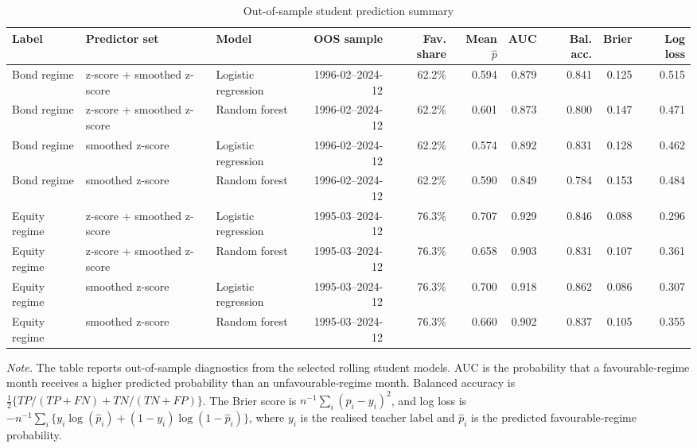 \begin{table}[H]
\centering
\caption{Out-of-sample student prediction summary}
\label{tab:student-oos-prediction-summary}
\scriptsize
\setlength{\tabcolsep}{3.2pt}
\renewcommand{\arraystretch}{1.10}
\begin{adjustbox}{center,max width=\linewidth}
\begin{tabular}{lllrrrrrrr}
\toprule
Label & Predictor set & Model & OOS sample & Fav. share & Mean $\hat p$ & AUC & Bal. acc. & Brier & Log loss \\
\midrule
Bond regime & z-score + smoothed z-score & Logistic regression & 1996-02--2024-12 & 62.2\% & 0.594 & 0.879 & 0.841 & 0.125 & 0.515 \\
Bond regime & z-score + smoothed z-score & Random forest & 1996-02--2024-12 & 62.2\% & 0.601 & 0.873 & 0.800 & 0.147 & 0.471 \\
Bond regime & smoothed z-score & Logistic regression & 1996-02--2024-12 & 62.2\% & 0.574 & 0.892 & 0.831 & 0.128 & 0.462 \\
Bond regime & smoothed z-score & Random forest & 1996-02--2024-12 & 62.2\% & 0.590 & 0.849 & 0.784 & 0.153 & 0.484 \\
Equity regime & z-score + smoothed z-score & Logistic regression & 1995-03--2024-12 & 76.3\% & 0.707 & 0.929 & 0.846 & 0.088 & 0.296 \\
Equity regime & z-score + smoothed z-score & Random forest & 1995-03--2024-12 & 76.3\% & 0.658 & 0.903 & 0.831 & 0.107 & 0.361 \\
Equity regime & smoothed z-score & Logistic regression & 1995-03--2024-12 & 76.3\% & 0.700 & 0.918 & 0.862 & 0.086 & 0.307 \\
Equity regime & smoothed z-score & Random forest & 1995-03--2024-12 & 76.3\% & 0.660 & 0.902 & 0.837 & 0.105 & 0.355 \\
\bottomrule
\end{tabular}
\end{adjustbox}
\vspace{0.45em}
\begin{minipage}{0.97\linewidth}
\footnotesize
\emph{Note.} The table reports out-of-sample diagnostics from the selected rolling student models. AUC is the probability that a favourable-regime month receives a higher predicted probability than an unfavourable-regime month. Balanced accuracy is
\(\frac{1}{2}\{TP/(TP+FN)+TN/(TN+FP)\}\). The Brier score is \(n^{-1}\sum_i(\hat p_i-y_i)^2\), and log loss is \(-n^{-1}\sum_i\{y_i\log(\hat p_i)+(1-y_i)\log(1-\hat p_i)\}\), where \(y_i\) is the realised teacher label and \(\hat p_i\) is the predicted favourable-regime probability.
\end{minipage}
\end{table}

